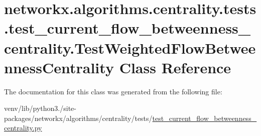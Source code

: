 \hypertarget{classnetworkx_1_1algorithms_1_1centrality_1_1tests_1_1test__current__flow__betweenness__centrali2afb21a78fbdf02e64d7b1038b582239}{}\section{networkx.\+algorithms.\+centrality.\+tests.\+test\+\_\+current\+\_\+flow\+\_\+betweenness\+\_\+centrality.\+Test\+Weighted\+Flow\+Betweenness\+Centrality Class Reference}
\label{classnetworkx_1_1algorithms_1_1centrality_1_1tests_1_1test__current__flow__betweenness__centrali2afb21a78fbdf02e64d7b1038b582239}


The documentation for this class was generated from the following file\+:\begin{DoxyCompactItemize}
\item 
venv/lib/python3./site-\/packages/networkx/algorithms/centrality/tests/\hyperlink{test__current__flow__betweenness__centrality_8py}{test\+\_\+current\+\_\+flow\+\_\+betweenness\+\_\+centrality.\+py}\end{DoxyCompactItemize}
